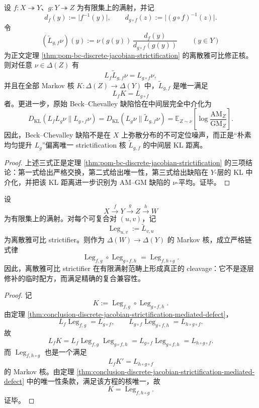 \begin{theorem}\label{thm:conclusion-discrete-jacobian-strictification-mediated-defect}
设 \(f:X\twoheadrightarrow Y\)、\(g:Y\twoheadrightarrow Z\) 为有限集上的满射，并记
\[
d_f(y):=\lvert f^{-1}(y)\rvert,\qquad
d_{g\circ f}(z):=\lvert(g\circ f)^{-1}(z)\rvert.
\]
令
\[
(\widetilde L_{g,f}\nu)(y):=\nu(g(y))\,\frac{d_f(y)}{d_{g\circ f}(g(y))}
\qquad (y\in Y)
\]
为正文定理 \ref{thm:pom-bc-discrete-jacobian-strictification} 的离散雅可比修正核。则对任意 \(\nu\in\Delta(Z)\) 有
\[
L_f\widetilde L_{g,f}\nu=L_{g\circ f}\nu,
\]
并且在全部 Markov 核 \(K:\Delta(Z)\to\Delta(Y)\) 中，\(\widetilde L_{g,f}\) 是唯一满足
\[
L_fK=L_{g\circ f}
\]
者。更进一步，原始 Beck--Chevalley 缺陷恰在中间层完全中介化为
\[
D_{\mathrm{KL}}(L_fL_g\nu\|L_{g\circ f}\nu)
=
D_{\mathrm{KL}}(L_g\nu\|\widetilde L_{g,f}\nu)
=
\mathbb E_{Z\sim\nu}\!\left[\log\frac{\mathrm{AM}_Z}{\mathrm{GM}_Z}\right].
\]
因此，Beck--Chevalley 缺陷不是在 \(X\) 上弥散分布的不可定位噪声，而正是“朴素均匀提升 \(L_g\)”偏离唯一 strictification 核 \(\widetilde L_{g,f}\) 的中间层 KL 距离。
\end{theorem}
\begin{proof}
上述三式正是定理 \ref{thm:pom-bc-discrete-jacobian-strictification} 的三项结论：第一式给出严格交换，第二式给出唯一性，第三式给出缺陷在 \(Y\)-层的 KL 中介化，并把该 KL 距离进一步识别为 AM--GM 缺陷的 \(\nu\)-平均。证毕。
\end{proof}

\begin{theorem}\label{thm:conclusion-discrete-jacobian-strictifier-chain-rule}
设
\[
X\xrightarrow{f}Y\xrightarrow{g}Z\xrightarrow{h}W
\]
为有限集上的满射。对每个可复合对 \((u,v)\)，记
\[
\operatorname{Leg}_{u,v}:=\widetilde L_{v,u}
\]
为离散雅可比 strictifier。则作为 \(\Delta(W)\to\Delta(Y)\) 的 Markov 核，成立严格链式律
\[
\operatorname{Leg}_{f,g}\circ \operatorname{Leg}_{g\circ f,h}
=
\operatorname{Leg}_{f,h\circ g}.
\]
因此，离散雅可比 strictifier 在有限满射范畴上形成真正的 cleavage：它不是逐层修补的临时配方，而满足精确的复合兼容性。
\end{theorem}
\begin{proof}
记
\[
K:=\operatorname{Leg}_{f,g}\circ \operatorname{Leg}_{g\circ f,h}.
\]
由定理 \ref{thm:conclusion-discrete-jacobian-strictification-mediated-defect}，
\[
L_f\operatorname{Leg}_{f,g}=L_{g\circ f},
\qquad
L_{g\circ f}\operatorname{Leg}_{g\circ f,h}=L_{h\circ g\circ f}.
\]
故
\[
L_fK
=
L_f\operatorname{Leg}_{f,g}\operatorname{Leg}_{g\circ f,h}
=
L_{g\circ f}\operatorname{Leg}_{g\circ f,h}
=
L_{h\circ g\circ f}.
\]
而 \(\operatorname{Leg}_{f,h\circ g}\) 也是一个满足
\[
L_fK'=L_{h\circ g\circ f}
\]
的 Markov 核。由定理 \ref{thm:conclusion-discrete-jacobian-strictification-mediated-defect} 中的唯一性条款，满足该方程的核唯一，故
\[
K=\operatorname{Leg}_{f,h\circ g}.
\]
证毕。
\end{proof}

